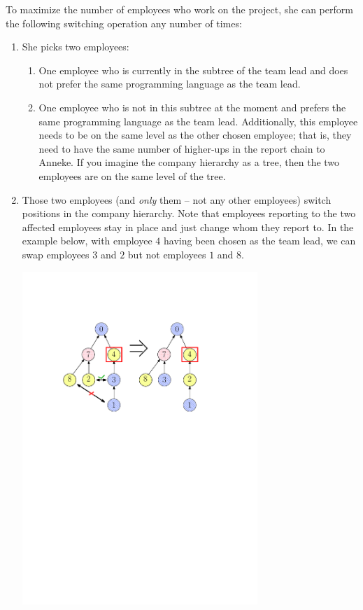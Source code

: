 \begin{enumerate}
To maximize the number of employees who work on the project, she can perform the following switching operation any number of times:
\begin{enumerate}
\item She picks two employees:
    \begin{enumerate}
    \item One employee who is currently in the subtree of the team lead and does not prefer the same programming language as the team lead.
    \item One employee who is not in this subtree at the moment and prefers the same programming language as the team lead.
    Additionally, this employee needs to be on the same level as the other chosen employee; that is, they need to have the same number of higher-ups in the report chain to Anneke. If you imagine the company hierarchy as a tree, then the two employees are on the same level of the tree.
    \end{enumerate}
\item Those two employees (and \emph{only} them -- not any other employees) switch positions in the company hierarchy.
Note that employees reporting to the two affected employees stay in place and just change whom they report to.
In the example below, with employee $4$ having been chosen as the team lead, we can swap employees $3$ and $2$ but not employees $1$ and $8$.
\begin{center}
\includegraphics[width=0.7\textwidth]{swap}
\end{center}
\end{enumerate}
\end{enumerate}

